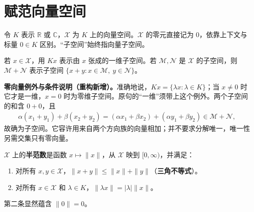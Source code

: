 \documentclass[../../main.tex]{subfiles}
\begin{document}
\section{赋范向量空间}\label{section:ch05-normed-spaces}
令 $K$ 表示 $\mathbb R$ 或 $\mathbb C$，$\mathcal X$ 为 $K$ 上的向量空间。$\mathcal X$ 的零元直接记为 $0$，依靠上下文与标量 $0\in K$ 区别。“子空间”始终指向量子空间。
\begin{definition}[生成的一维子空间与子空间之和]\label{definition:ch05-subspace-notation}
若 $x\in\mathcal X$，用 $Kx$ 表示由 $x$ 张成的一维子空间。若 $\mathcal M,\mathcal N$ 是 $\mathcal X$ 的子空间，则 $\mathcal M+\mathcal N$ 表示子空间 $\{x+y:x\in\mathcal M,\ y\in\mathcal N\}$。
\end{definition}
\begin{remark}
\textbf{零向量例外与条件说明（重构新增）。}准确地说，$Kx=\{\lambda x:\lambda\in K\}$；当 $x\ne0$ 时它才是一维，$x=0$ 时为零维子空间。原句的“一维”须带上这个例外。两个子空间的和含 $0+0$，且
\begin{align*}
\alpha(x_1+y_1)+\beta(x_2+y_2)=(\alpha x_1+\beta x_2)+(\alpha y_1+\beta y_2)\in\mathcal M+\mathcal N,
\end{align*}
故确为子空间。它容许用来自两个方向族的向量相加；并不要求分解唯一，唯一性另需交集只有零向量。
\end{remark}
\begin{definition}[半范数]\label{definition:ch05-seminorm}
$\mathcal X$ 上的\textbf{半范数}是函数 $x\mapsto\|x\|$，从 $\mathcal X$ 映到 $[0,\infty)$，并满足：
\begin{enumerate}
\item\label{item:ch05-seminorm-triangle} 对所有 $x,y\in\mathcal X$，$\|x+y\|\le\|x\|+\|y\|$（\textbf{三角不等式}）。
\item\label{item:ch05-seminorm-homogeneity} 对所有 $x\in\mathcal X$ 和 $\lambda\in K$，$\|\lambda x\|=|\lambda|\|x\|$。
\end{enumerate}
\end{definition}
第二条显然蕴含 $\|0\|=0$。
\end{document}
